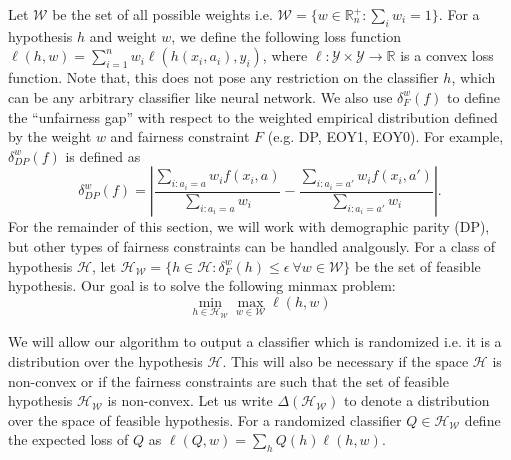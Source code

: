 \documentclass[11pt]{article}
\newcommand{\set}[1]{\{#1\}}
\newcommand{\bbR}{\mathbb{R}}
\newcommand{\WW}{\mathcal{W}}
\newcommand{\abs}[1]{\left|#1\right|}
\newcommand{\HH}{\mathcal{H}}
\newcommand{\YY}{\mathcal{Y}}
\begin{document}
Let $\WW$ be the set of all possible weights i.e. $\WW = \set{w \in \bbR^+_n : \sum_i w_i = 1}$. For a hypothesis $h$ and weight $w$, we define the following loss function $\ell(h,w) = \sum_{i=1}^n w_i \ell(h(x_i,a_i), y_i)$, where $\ell: \YY \times \YY \rightarrow \bbR$ is a convex loss function. Note that, this does not pose any restriction on the classifier $h$, which can be any arbitrary classifier like neural network. We also use $\delta_F^w(f)$ to define the ``unfairness gap'' with respect to the weighted empirical distribution defined by the weight $w$ and fairness constraint $F$ (e.g. DP, EOY1, EOY0). For example, $\delta^w_{DP}(f)$ is defined as
$$\delta^w_{DP}(f) = \abs{ \frac{\sum_{i: a_i = a} w_i f(x_i,a)}{\sum_{i: a_i = a} w_i} -  \frac{\sum_{i: a_i = a'} w_i f(x_i,a')}{{\sum_{i: a_i = a'} w_i}} }.$$ For the remainder of this section, we will work with demographic parity (DP), but other types of fairness constraints can be handled analgously.
For a class of hypothesis $\HH$, let $\HH_{\WW} = \set{h \in \HH: \delta^w_F(h) \le \epsilon\ \forall w \in \WW}$ be the set of feasible hypothesis. 
Our goal is to solve the following minmax problem:
\begin{equation}\label{eq:det-wt-classification}
\min_{h \in {\HH}_{\WW} } \max_{w \in \WW} \ell(h,w) 
\end{equation}

We will allow our algorithm to output a classifier which is randomized i.e. it is a distribution over the hypothesis $\HH$. This will also be necessary if the space $\HH$ is non-convex or if the fairness constraints are such that the set of feasible hypothesis $\HH_{\WW}$ is non-convex. Let us write $\Delta(\HH_{\WW})$ to denote a distribution over the space of feasible hypothesis. For a randomized classifier $Q \in \HH_{\WW}$ define the expected loss of $Q$ as $\ell(Q,w) = \sum_{h} Q(h) \ell(h,w)$. 


\end{document}
